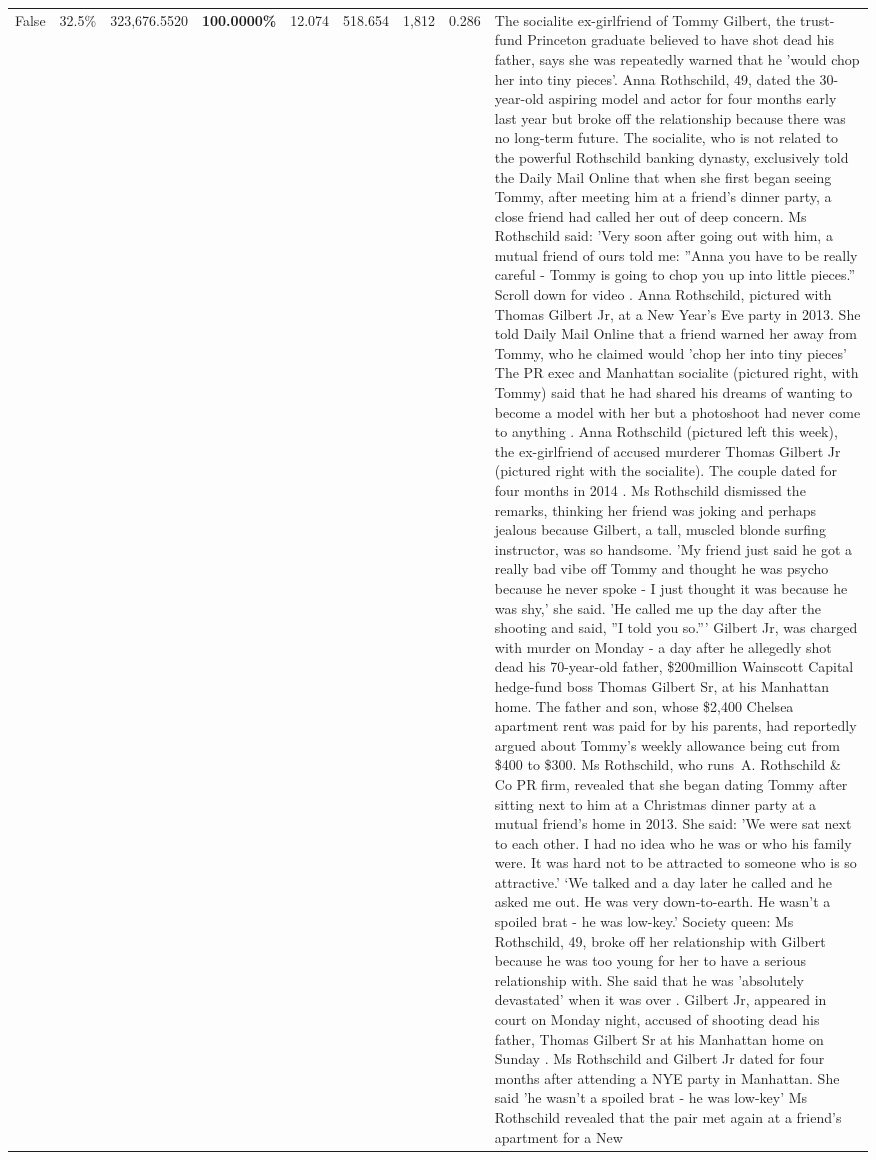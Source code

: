 \begin{table}[H]
\begin{tabular}{lllrlllll}
False & 32.5\% & 323,676.5520 & \bfseries \color{red} 100.0000\% & 12.074 & 518.654 & 1,812 & 0.286 & The socialite ex-girlfriend of Tommy Gilbert, the trust-fund Princeton graduate believed to have shot dead his father, says she was repeatedly warned that he 'would chop her into tiny pieces'. Anna Rothschild, 49, dated the 30-year-old aspiring model and actor for four months early last year but broke off the relationship because there was no long-term future. The socialite, who is not related to the powerful Rothschild banking dynasty, exclusively told the Daily Mail Online that when she first began seeing Tommy, after meeting him at a friend's dinner party, a close friend had called her out of deep concern. Ms Rothschild said: 'Very soon after going out with him, a mutual friend of ours told me: ''Anna you have to be really careful - Tommy is going to chop you up into little pieces.'' Scroll down for video . Anna Rothschild, pictured with Thomas Gilbert Jr, at a New Year's Eve party in 2013. She told Daily Mail Online that a friend warned her away from Tommy, who he claimed would 'chop her into tiny pieces' The PR exec and Manhattan socialite (pictured right, with Tommy) said that he had shared his dreams of wanting to become a model with her but a photoshoot had never come to anything . Anna Rothschild (pictured left this week), the ex-girlfriend of accused murderer Thomas Gilbert Jr (pictured right with the socialite). The couple dated for four months in 2014 . Ms Rothschild dismissed the remarks, thinking her friend was joking and perhaps jealous because Gilbert, a tall, muscled blonde surfing instructor, was so handsome. 'My friend just said he got a really bad vibe off Tommy and thought he was psycho because he never spoke - I just thought it was because he was shy,' she said. 'He called me up the day after the shooting and said, ''I told you so.''' Gilbert Jr, was charged with murder on Monday - a day after he allegedly shot dead his 70-year-old father, \$200million Wainscott Capital hedge-fund boss Thomas Gilbert Sr, at his Manhattan home. The father and son, whose \$2,400 Chelsea apartment rent was paid for by his parents, had reportedly argued about Tommy's weekly allowance being cut from \$400 to \$300. Ms Rothschild, who runs A. Rothschild \& Co PR firm, revealed that she began dating Tommy after sitting next to him at a Christmas dinner party at a mutual friend's home in 2013. She said: 'We were sat next to each other. I had no idea who he was or who his family were. It was hard not to be attracted to someone who is so attractive.' ‘We talked and a day later he called and he asked me out. He was very down-to-earth. He wasn’t a spoiled brat - he was low-key.’ Society queen: Ms Rothschild, 49, broke off her relationship with Gilbert because he was too young for her to have a serious relationship with. She said that he was 'absolutely devastated' when it was over . Gilbert Jr, appeared in court on Monday night, accused of shooting dead his father, Thomas Gilbert Sr at his Manhattan home on Sunday . Ms Rothschild and Gilbert Jr dated for four months after attending a NYE party in Manhattan. She said 'he wasn't a spoiled brat - he was low-key' Ms Rothschild revealed that the pair met again at a friend’s apartment for a New 
\end{tabular}
\end{table}
